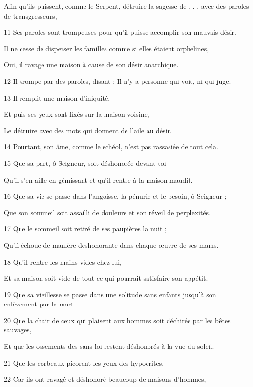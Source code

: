 \par     Afin qu'ils puissent, comme le Serpent, détruire la sagesse de . . . avec des paroles de transgresseurs,
\par 11 Ses paroles sont trompeuses pour qu'il puisse accomplir son mauvais désir.
\par     Il ne cesse de disperser les familles comme si elles étaient orphelines,
\par     Oui, il ravage une maison à cause de son désir anarchique.
\par 12 Il trompe par des paroles, disant : Il n'y a personne qui voit, ni qui juge.
\par 13 Il remplit une maison d'iniquité,
\par     Et puis ses yeux sont fixés sur la maison voisine,
\par     Le détruire avec des mots qui donnent de l'aile au désir.
\par 14 Pourtant, son âme, comme le schéol, n'est pas rassasiée de tout cela.
\par   
\par 15 Que sa part, ô Seigneur, soit déshonorée devant toi ;
\par     Qu'il s'en aille en gémissant et qu'il rentre à la maison maudit.
\par 16 Que sa vie se passe dans l'angoisse, la pénurie et le besoin, ô Seigneur ;
\par     Que son sommeil soit assailli de douleurs et son réveil de perplexités.
\par 17 Que le sommeil soit retiré de ses paupières la nuit ;
\par     Qu'il échoue de manière déshonorante dans chaque œuvre de ses mains.
\par 18 Qu'il rentre les mains vides chez lui,
\par     Et sa maison soit vide de tout ce qui pourrait satisfaire son appétit.
\par 19 Que sa vieillesse se passe dans une solitude sans enfants jusqu'à son enlèvement par la mort.
\par   
\par 20 Que la chair de ceux qui plaisent aux hommes soit déchirée par les bêtes sauvages,
\par     Et que les ossements des sans-loi restent déshonorés à la vue du soleil.
\par 21 Que les corbeaux picorent les yeux des hypocrites.
\par 22 Car ils ont ravagé et déshonoré beaucoup de maisons d'hommes,
